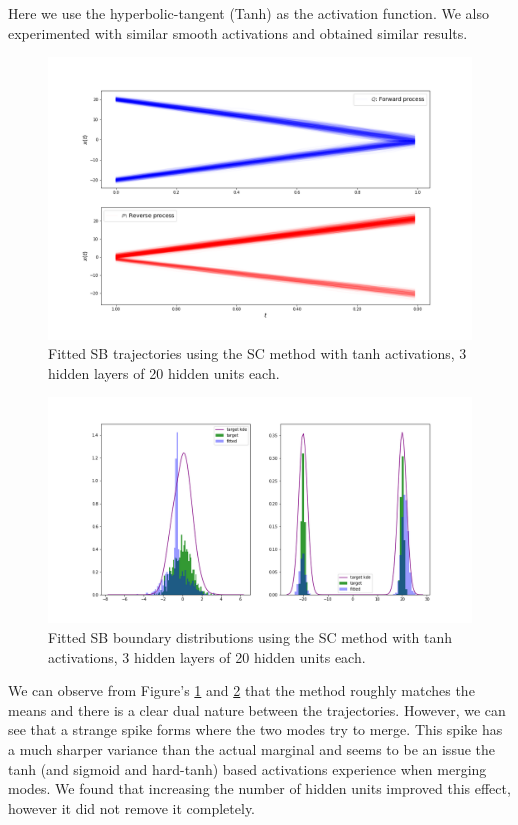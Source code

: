 \documentclass[a4paper,12pt,twoside,openright]{report}
\theoremstyle{definition}
\begin{document}
Here we use the hyperbolic-tangent (Tanh) as the activation function. We also experimented with similar smooth activations and obtained similar results.
\begin{figure}
    \centering
    \includegraphics[scale=0.4,trim={2.3cm 1cm 2.5cm 0}, clip]{images/Control/bimodal_marginals_best_tanh_trajectories.png}
    \caption{ Fitted SB  trajectories using the SC method with tanh activations, 3 hidden layers of 20 hidden units each.}
    \label{fig:trajectoriesbimodtanhnn}
\end{figure}
\begin{figure}
    \centering
    \includegraphics[scale=0.4,trim={2.3cm 1cm 2.5cm 0}, clip]{images/Control/bimodal_marginals_best_tanh.png}
    \caption{ Fitted SB  boundary distributions using the SC method with tanh activations, 3 hidden layers of 20 hidden units each.}
    \label{fig:boundsbimodtanhnn}
\end{figure}
We can observe from Figure's \ref{fig:trajectoriesbimodtanhnn} and \ref{fig:boundsbimodtanhnn} that the method roughly matches the means and there is a clear dual nature between the trajectories. However, we can see that a strange spike forms where the two modes try to merge. This spike has a much sharper variance than the actual marginal and seems to be an issue the tanh (and sigmoid and hard-tanh) based activations experience when merging modes. We found that increasing the number of hidden units improved this effect, however it did not remove it completely. 
\end{document}
